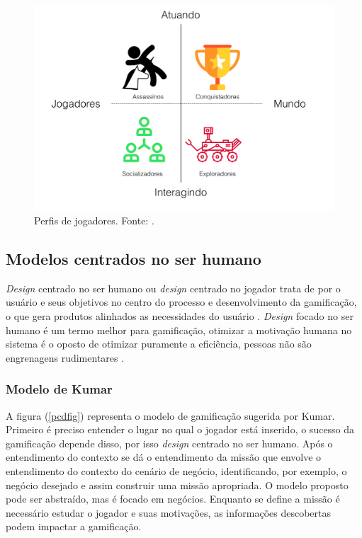 \begin{figure}[h]
	\centering
		\includegraphics[keepaspectratio=true,scale=0.35]{figuras/bartlefig.png}
	\caption{Perfis de jogadores. Fonte: \cite{bartle1996hearts}.\label{bartlefig}
}
\end{figure}

 

\subsection{Modelos centrados no ser humano}

\textit{Design}  centrado no ser humano ou \textit{design}  centrado no jogador trata de por o usuário e seus objetivos no centro do processo e desenvolvimento da gamificação, o que gera produtos alinhados as necessidades do usuário \cite{kumar2013gamification}. \textit{Design}  focado no ser humano é um termo melhor para gamificação, otimizar a motivação humana no sistema é o oposto de otimizar puramente a eficiência, pessoas não são engrenagens rudimentares \cite{chou2015actionable}.

\newpage

\subsubsection{Modelo de Kumar}

A figura (\ref{pcdfig}) representa o modelo de gamificação sugerida por Kumar. Primeiro é preciso entender o lugar no qual o jogador está inserido, o sucesso da gamificação depende disso, por isso \textit{design} centrado no ser humano. Após o entendimento do contexto se dá o entendimento da missão que envolve o entendimento do contexto do cenário de negócio, identificando, por exemplo, o negócio desejado e assim construir uma missão apropriada. O modelo proposto pode ser abstraído, mas é focado em negócios. Enquanto se define a missão é necessário estudar o jogador e suas motivações, as informações descobertas podem impactar a gamificação.

